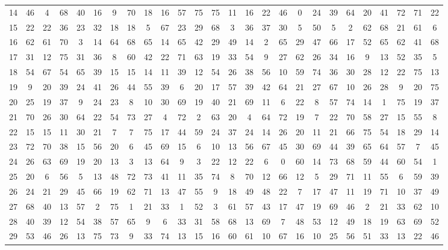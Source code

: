 \begin{table}
\begin{tabular}{c c c c c c c c c c c c c c c c c c c c c c c c c c }
14 & 46 & 4 & 68 & 40 & 16 & 9 & 70 & 18 & 16 & 57 & 75 & 75 & 11 & 16 & 22 & 46 & 0 & 24 & 39 & 64 & 20 & 41 & 72 & 71 & 22 \\
15 & 22 & 22 & 36 & 23 & 32 & 18 & 18 & 5 & 67 & 23 & 29 & 68 & 3 & 36 & 37 & 30 & 5 & 50 & 5 & 2 & 62 & 68 & 21 & 61 & 6 \\
16 & 62 & 61 & 70 & 3 & 14 & 64 & 68 & 65 & 14 & 65 & 42 & 29 & 49 & 14 & 2 & 65 & 29 & 47 & 66 & 17 & 52 & 65 & 62 & 41 & 68 \\
17 & 31 & 12 & 75 & 31 & 36 & 8 & 60 & 42 & 22 & 71 & 63 & 19 & 33 & 54 & 9 & 27 & 62 & 26 & 34 & 16 & 9 & 13 & 52 & 35 & 5 \\
18 & 54 & 67 & 54 & 65 & 39 & 15 & 15 & 14 & 11 & 39 & 12 & 54 & 26 & 38 & 56 & 10 & 59 & 74 & 36 & 30 & 28 & 12 & 22 & 75 & 13 \\
19 & 9 & 20 & 39 & 24 & 41 & 26 & 44 & 55 & 39 & 6 & 20 & 17 & 57 & 39 & 42 & 64 & 21 & 27 & 67 & 10 & 26 & 28 & 9 & 20 & 75 \\
20 & 25 & 19 & 37 & 9 & 24 & 23 & 8 & 10 & 30 & 69 & 19 & 40 & 21 & 69 & 11 & 6 & 22 & 8 & 57 & 74 & 14 & 1 & 75 & 19 & 37 \\
21 & 70 & 26 & 30 & 64 & 22 & 54 & 73 & 27 & 4 & 72 & 2 & 63 & 20 & 4 & 64 & 72 & 19 & 7 & 22 & 70 & 58 & 27 & 15 & 55 & 8 \\
22 & 15 & 15 & 11 & 30 & 21 & 7 & 7 & 75 & 17 & 44 & 59 & 24 & 37 & 24 & 14 & 26 & 20 & 11 & 21 & 66 & 75 & 54 & 18 & 29 & 14 \\
23 & 72 & 70 & 38 & 15 & 56 & 20 & 6 & 45 & 69 & 15 & 6 & 10 & 13 & 56 & 67 & 45 & 30 & 69 & 44 & 39 & 65 & 64 & 57 & 7 & 45 \\
24 & 26 & 63 & 69 & 19 & 20 & 13 & 3 & 13 & 64 & 9 & 3 & 22 & 12 & 22 & 6 & 0 & 60 & 14 & 73 & 68 & 59 & 44 & 60 & 54 & 1 \\
25 & 20 & 6 & 56 & 5 & 13 & 48 & 72 & 73 & 41 & 11 & 35 & 74 & 8 & 70 & 12 & 66 & 12 & 5 & 29 & 71 & 11 & 55 & 6 & 59 & 39 \\
26 & 24 & 21 & 29 & 45 & 66 & 19 & 62 & 71 & 13 & 47 & 55 & 9 & 18 & 49 & 48 & 22 & 7 & 17 & 47 & 11 & 19 & 71 & 10 & 37 & 49 \\
27 & 68 & 40 & 13 & 57 & 2 & 75 & 1 & 21 & 33 & 1 & 52 & 3 & 61 & 57 & 43 & 17 & 47 & 19 & 69 & 46 & 2 & 21 & 33 & 62 & 10 \\
28 & 40 & 39 & 12 & 54 & 38 & 57 & 65 & 9 & 6 & 33 & 31 & 58 & 68 & 13 & 69 & 7 & 48 & 53 & 12 & 49 & 18 & 19 & 63 & 69 & 52 \\
29 & 53 & 46 & 26 & 13 & 75 & 73 & 9 & 33 & 74 & 13 & 15 & 16 & 60 & 61 & 10 & 67 & 16 & 10 & 25 & 56 & 51 & 33 & 13 & 22 & 46 \\

\end{tabular}
\end{table}
